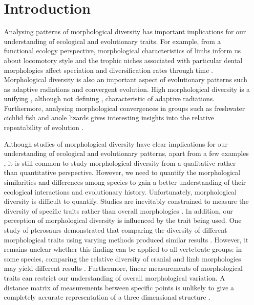 \documentclass[12pt,a4paper]{article}
\begin{document}
\section{Introduction}

	Analysing patterns of morphological diversity has important implications for our understanding of ecological and evolutionary traits. For example, from a functional ecology perspective, morphological characteristics of limbs inform us about locomotory style \citep[e.g.][]{Bou1987} and the trophic niches associated with particular dental morphologies affect speciation and diversification rates through time \citep{Price2012}. Morphological diversity is also an important aspect of evolutionary patterns such as adaptive radiations and convergent evolution. High morphological diversity is a unifying \citep{Losos2010a, Olson2009}, although not defining \citep{Glor2010, Olson2009}, characteristic of adaptive radiations. Furthermore, analysing morphological convergences in groups such as freshwater cichlid fish \citep{Muschick2012} and anole lizards \citep{Mahler2013} gives interesting insights into the relative repeatability of evolution \citep{Losos2011}.

	Although studies of morphological diversity have clear implications for our understanding of ecological and evolutionary patterns, apart from a few examples \citep[e.g.][]{Ruta2013, Goswami2011, Brusatte2008}, it is still common to study morphological diversity from a qualitative rather than quantitative perspective. However, we need to quantify the morphological similarities and differences among species to gain a better understanding of their ecological interactions and evolutionary history. Unfortunately, morphological diversity is difficult to quantify. Studies are inevitably constrained to measure the diversity of specific traits rather than overall morphologies \citep{Roy1997}. In addition, our perception of morphological diversity is influenced by the trait being used. One study of pterosaurs demonstrated that comparing the diversity of different morphological traits using varying methods produced similar results \citep{Foth2012}. However, it remains unclear whether this finding can be applied to all vertebrate groups: in some species, comparing the relative diversity of cranial and limb morphologies may yield different results \citep{Foth2012}. Furthermore, linear measurements of morphological traits can restrict our understanding of overall morphological variation. A distance matrix of measurements between specific points is unlikely to give a completely accurate representation of a three dimensional structure \citep{Rohlf1993}.
	
\end{document}
